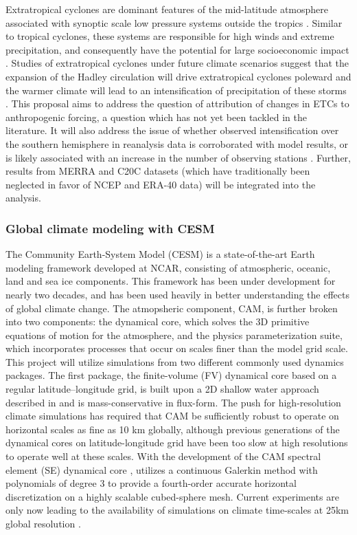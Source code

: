 \documentclass[11pt]{article}
\begin{document}
Extratropical cyclones are dominant features of the mid-latitude atmosphere associated with synoptic scale low pressure systems outside the tropics \citep{serreze1995climatological}.  Similar to tropical cyclones, these systems are responsible for high winds and extreme precipitation, and consequently have the potential for large socioeconomic impact \citep{ulbrich2009extra}.  Studies of extratropical cyclones under future climate scenarios suggest that the expansion of the Hadley circulation will drive extratropical cyclones poleward \citep{bengtsson2006storm} and the warmer climate will lead to an intensification of precipitation of these storms \citep{bengtsson2009will, zappa2013multi}.  This proposal aims to address the question of attribution of changes in ETCs to anthropogenic forcing, a question which has not yet been tackled in the literature.  It will also address the issue of whether observed intensification over the southern hemisphere in reanalysis data is corroborated with model results, or is likely associated with an increase in the number of observing stations \citep{simmonds2000variability}.  Further, results from MERRA and C20C datasets (which have traditionally been neglected in favor of NCEP and ERA-40 data) will be integrated into the analysis.

\subsubsection{Global climate modeling with CESM}

The Community Earth-System Model (CESM) \cite{RBNetal2010NCAR} is a state-of-the-art Earth modeling framework developed at NCAR, consisting of atmospheric, oceanic, land and sea ice components.  This framework has been under development for nearly two decades, and has been used heavily in better understanding the effects of global climate change.  The atmopsheric component, CAM, is further broken into two components: the dynamical core, which solves the 3D primitive equations of motion for the atmosphere, and the physics parameterization suite, which incorporates processes that occur on scales finer than the model grid scale. This project will utilize simulations from two different commonly used dynamics packages. The first package, the finite-volume (FV) dynamical core based on a regular latitude--longitude grid, is built upon a 2D shallow water approach described in \citet{Lin1996,Lin1997} and is mass-conservative in flux-form. The push for high-resolution climate simulations has required that CAM be sufficiently robust to operate on horizontal scales as fine as 10 km globally, although previous generations of the dynamical cores on latitude-longitude grid have been too slow at high resolutions to operate well at these scales.  With the development of the CAM spectral element (SE) dynamical core \citep{dennis2012cam}, utilizes a continuous Galerkin method with polynomials of degree 3 to provide a fourth-order accurate horizontal discretization on a highly scalable cubed-sphere mesh.  Current experiments are only now leading to the availability of simulations on climate time-scales at 25km global resolution \citep{Bacmeister2014, Wehner2014, Wehner2015}.
\end{document}
